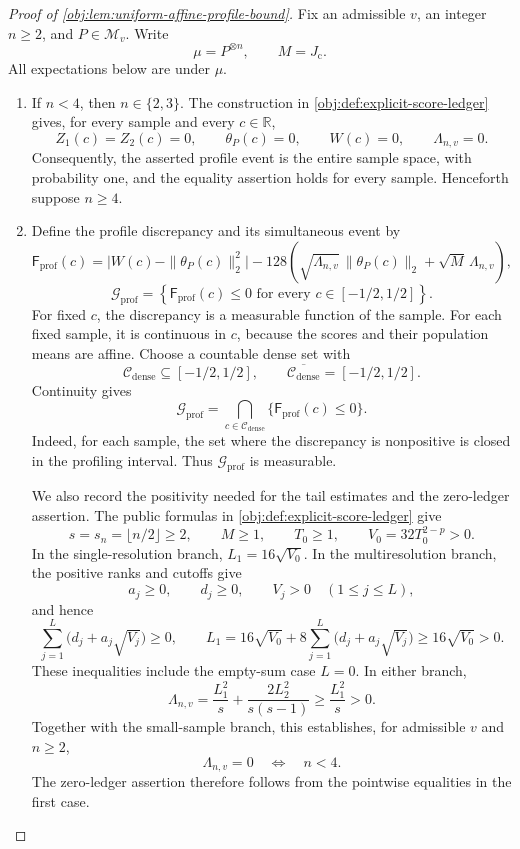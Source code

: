 \begin{proof}[Proof of \cref{obj:lem:uniform-affine-profile-bound}]
Fix an admissible \(v\), an integer \(n\ge2\), and \(P\in\mathcal M_v\). Write
\[
\mu=P^{\otimes n},
\qquad
M=J_{\mathrm c}.
\]
All expectations below are under \(\mu\).

\begin{enumerate}
\item
If \(n<4\), then \(n\in\{2,3\}\). The construction in \cref{obj:def:explicit-score-ledger} gives, for every sample and every \(c\in\mathbb R\),
\[
Z_1(c)=Z_2(c)=0,
\qquad
\theta_P(c)=0,
\qquad
W(c)=0,
\qquad
\Lambda_{n,v}=0.
\]
Consequently, the asserted profile event is the entire sample space, with probability one, and the equality assertion holds for every sample. Henceforth suppose \(n\ge4\).

\item
Define the profile discrepancy and its simultaneous event by
\[
\mathsf F_{\mathrm{prof}}(c)
=
\bigl|W(c)-\|\theta_P(c)\|_2^2\bigr|
-
128\left(
\sqrt{\Lambda_{n,v}}\,\|\theta_P(c)\|_2
+\sqrt M\,\Lambda_{n,v}
\right),
\]
\[
\mathcal G_{\mathrm{prof}}
=
\left\{
\mathsf F_{\mathrm{prof}}(c)\le0
\text{ for every }c\in[-1/2,1/2]
\right\}.
\]
For fixed \(c\), the discrepancy is a measurable function of the sample. For each fixed sample, it is continuous in \(c\), because the scores and their population means are affine. Choose a countable dense set with
\[
\mathcal C_{\mathrm{dense}}\subseteq[-1/2,1/2],
\qquad
\overline{\mathcal C_{\mathrm{dense}}}=[-1/2,1/2].
\]
Continuity gives
\[
\mathcal G_{\mathrm{prof}}
=
\bigcap_{c\in\mathcal C_{\mathrm{dense}}}
\{\mathsf F_{\mathrm{prof}}(c)\le0\}.
\]
Indeed, for each sample, the set where the discrepancy is nonpositive is closed in the profiling interval. Thus \(\mathcal G_{\mathrm{prof}}\) is measurable.

We also record the positivity needed for the tail estimates and the zero-ledger assertion. The public formulas in \cref{obj:def:explicit-score-ledger} give
\[
s=s_n=\lfloor n/2\rfloor\ge2,
\qquad
M\ge1,
\qquad
T_0\ge1,
\qquad
V_0=32T_0^{2-p}>0.
\]
In the single-resolution branch, \(L_1=16\sqrt{V_0}\). In the multiresolution branch, the positive ranks and cutoffs give
\[
a_j\ge0,\qquad d_j\ge0,\qquad V_j>0
\quad(1\le j\le L),
\]
and hence
\[
\sum_{j=1}^{L}\bigl(d_j+a_j\sqrt{V_j}\bigr)\ge0,
\qquad
L_1
=
16\sqrt{V_0}
+8\sum_{j=1}^{L}\bigl(d_j+a_j\sqrt{V_j}\bigr)
\ge16\sqrt{V_0}>0.
\]
These inequalities include the empty-sum case \(L=0\). In either branch,
\[
\Lambda_{n,v}
=
\frac{L_1^2}{s}+\frac{2L_2^2}{s(s-1)}
\ge\frac{L_1^2}{s}>0.
\]
Together with the small-sample branch, this establishes, for admissible \(v\) and \(n\ge2\),
\[
\Lambda_{n,v}=0
\quad\Longleftrightarrow\quad
n<4.
\]
The zero-ledger assertion therefore follows from the pointwise equalities in the first case.


\end{enumerate}
\end{proof}
